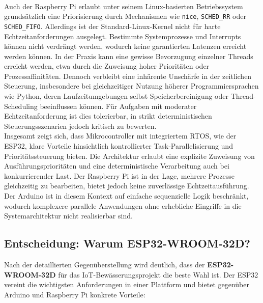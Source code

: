 \\
Auch der Raspberry Pi erlaubt unter seinem Linux-basierten Betriebssystem grundsätzlich eine Priorisierung durch Mechanismen wie \texttt{nice}, \texttt{SCHED\_RR} oder \texttt{SCHED\_FIFO}. Allerdings ist der Standard-Linux-Kernel nicht für harte Echtzeitanforderungen ausgelegt. Bestimmte Systemprozesse und Interrupts können nicht verdrängt werden, wodurch keine garantierten Latenzen erreicht werden können. In der Praxis kann eine gewisse Bevorzugung einzelner Threads erreicht werden, etwa durch die Zuweisung hoher Prioritäten oder Prozessaffinitäten. Dennoch verbleibt eine inhärente Unschärfe in der zeitlichen Steuerung, insbesondere bei gleichzeitiger Nutzung höherer Programmiersprachen wie Python, deren Laufzeitumgebungen selbst Speicherbereinigung oder Thread-Scheduling beeinflussen können. Für Aufgaben mit moderater Echtzeitanforderung ist dies tolerierbar, in strikt deterministischen Steuerungsszenarien jedoch kritisch zu bewerten.
\\
Insgesamt zeigt sich, dass Mikrocontroller mit integriertem RTOS, wie der ESP32, klare Vorteile hinsichtlich kontrollierter Task-Parallelisierung und Prioritätssteuerung bieten. Die Architektur erlaubt eine explizite Zuweisung von Ausführungsprioritäten und eine deterministische Verarbeitung auch bei konkurrierender Last. Der Raspberry Pi ist in der Lage, mehrere Prozesse gleichzeitig zu bearbeiten, bietet jedoch keine zuverlässige Echtzeitausführung. Der Arduino ist in diesem Kontext auf einfache sequenzielle Logik beschränkt, wodurch komplexere parallele Anwendungen ohne erhebliche Eingriffe in die Systemarchitektur nicht realisierbar sind.


\subsection{Entscheidung: Warum ESP32-WROOM-32D?}

Nach der detaillierten Gegenüberstellung wird deutlich, dass der \textbf{ESP32-WROOM-32D} für das IoT-Bewässerungsprojekt die beste Wahl ist. Der ESP32 vereint die wichtigsten Anforderungen in einer Plattform und bietet gegenüber Arduino und Raspberry Pi konkrete Vorteile:

